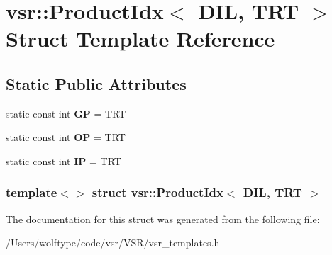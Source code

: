 \hypertarget{structvsr_1_1_product_idx_3_01_d_i_l_00_01_t_r_t_01_4}{\section{vsr\-:\-:Product\-Idx$<$ D\-I\-L, T\-R\-T $>$ Struct Template Reference}
\label{structvsr_1_1_product_idx_3_01_d_i_l_00_01_t_r_t_01_4}
}
\subsection*{Static Public Attributes}
\begin{DoxyCompactItemize}
\item 
\hypertarget{structvsr_1_1_product_idx_3_01_d_i_l_00_01_t_r_t_01_4_a2a3401d0f4d72fc338fc7f64dbc8ab8d}{static const int {\bfseries G\-P} = T\-R\-T}\label{structvsr_1_1_product_idx_3_01_d_i_l_00_01_t_r_t_01_4_a2a3401d0f4d72fc338fc7f64dbc8ab8d}

\item 
\hypertarget{structvsr_1_1_product_idx_3_01_d_i_l_00_01_t_r_t_01_4_aee4988198fb09c60ab461a77aff89e09}{static const int {\bfseries O\-P} = T\-R\-T}\label{structvsr_1_1_product_idx_3_01_d_i_l_00_01_t_r_t_01_4_aee4988198fb09c60ab461a77aff89e09}

\item 
\hypertarget{structvsr_1_1_product_idx_3_01_d_i_l_00_01_t_r_t_01_4_a42a588fcc72c1f08c55b952cb0780782}{static const int {\bfseries I\-P} = T\-R\-T}\label{structvsr_1_1_product_idx_3_01_d_i_l_00_01_t_r_t_01_4_a42a588fcc72c1f08c55b952cb0780782}

\end{DoxyCompactItemize}
\subsubsection*{template$<$$>$ struct vsr\-::\-Product\-Idx$<$ D\-I\-L, T\-R\-T $>$}



The documentation for this struct was generated from the following file\-:\begin{DoxyCompactItemize}
\item 
/\-Users/wolftype/code/vsr/\-V\-S\-R/vsr\-\_\-templates.\-h\end{DoxyCompactItemize}
